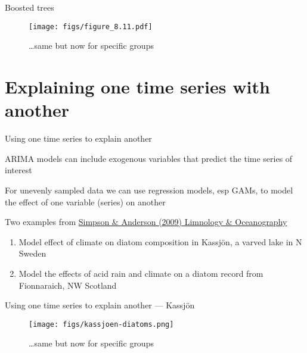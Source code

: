 \documentclass[11pt,ignorenonframetext,compress, aspectratio=169]{beamer}
\providecommand{\tightlist}{%
  \setlength{\itemsep}{0pt}\setlength{\parskip}{0pt}}
\begin{document}
\begin{frame}{Boosted trees}

\begin{figure}[htbp]
\centering
\texttt{[image: figs/figure\_8.11.pdf]}
\caption{\ldots{}same but now for specific groups}
\end{figure}

\end{frame}

\section{Explaining one time series with
another}\label{explaining-one-time-series-with-another}

\begin{frame}{Using one time series to explain another}

ARIMA models can include exogenous variables that predict the time
series of interest

For unevenly sampled data we can use regression models, esp GAMs, to
model the effect of one variable (series) on another

Two examples from
\href{http://www.aslo.org/lo/toc/vol_54/issue_6_part_2/2529.pdf}{Simpson
\& Anderson (2009) Limnology \& Oceanography}

\begin{enumerate}
\def\labelenumi{\arabic{enumi}.}
\tightlist
\item
  Model effect of climate on diatom composition in Kassjön, a varved
  lake in N Sweden
\item
  Model the effects of acid rain and climate on a diatom record from
  Fionnaraich, NW Scotland
\end{enumerate}

\end{frame}

\begin{frame}{Using one time series to explain another --- Kassjön}

\begin{figure}[htbp]
\centering
\texttt{[image: figs/kassjoen-diatoms.png]}
\caption{\ldots{}same but now for specific groups}
\end{figure}

\end{frame}
\end{document}
